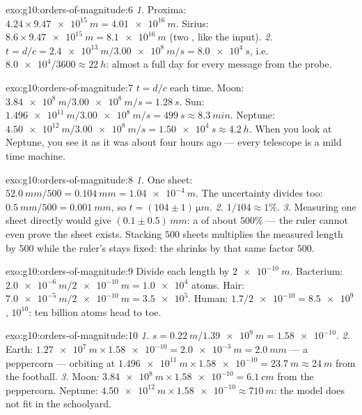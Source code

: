\begin{solution}{exo:g10:orders-of-magnitude:6}
\emph{1.} Proxima:
$4.24 \times \qty{9.47e15}{m} = \qty{4.01e16}{m}$. Sirius:
$8.6 \times \qty{9.47e15}{m} = \qty{8.1e16}{m}$ (two , like the input).
\emph{2.} $t = d/c = \qty{2.4e13}{m} / \qty{3.00e8}{m/s}
= \qty{8.0e4}{s}$, i.e.\ $\num{8.0e4}/3600 \approx \qty{22}{h}$:
almost a full day for every message from the probe.
\end{solution}

\begin{solution}{exo:g10:orders-of-magnitude:7}
$t = d/c$ each time. Moon:
$\qty{3.84e8}{m}/\qty{3.00e8}{m/s} = \qty{1.28}{s}$. Sun:
$\qty{1.496e11}{m}/\qty{3.00e8}{m/s} = \qty{499}{s} \approx
\qty{8.3}{min}$. Neptune:
$\qty{4.50e12}{m}/\qty{3.00e8}{m/s} = \qty{1.50e4}{s} \approx
\qty{4.2}{h}$. When you look at Neptune, you see it as it was about
four hours ago --- every telescope is a mild time machine.
\end{solution}

\begin{solution}{exo:g10:orders-of-magnitude:8}
\emph{1.} One sheet: $\qty{52.0}{mm}/500 = \qty{0.104}{mm}
= \qty{1.04e-4}{m}$. The uncertainty divides too:
$\qty{0.5}{mm}/500 = \qty{0.001}{mm}$, so
$t = (104 \pm 1)\,\unit{\micro m}$.
\emph{2.} $1/104 \approx 1\%$.
\emph{3.} Measuring one sheet directly would give
$(0.1 \pm 0.5)\,\unit{mm}$: a  of about $500\%$
--- the ruler cannot even prove the sheet exists. Stacking $500$
sheets multiplies the measured length by $500$ while the ruler's
 stays fixed: the  shrinks by
that same factor $500$.
\end{solution}

\begin{solution}{exo:g10:orders-of-magnitude:9}
Divide each length by $\qty{2e-10}{m}$. Bacterium:
$\qty{2.0e-6}{m}/\qty{2e-10}{m} = \num{1.0e4}$ atoms. Hair:
$\qty{7.0e-5}{m}/\qty{2e-10}{m} = \num{3.5e5}$. Human:
$1.7/\num{2e-10} = \num{8.5e9}$,  $10^{10}$: ten
billion atoms head to toe.
\end{solution}

\begin{solution}{exo:g10:orders-of-magnitude:10}
\emph{1.} $s = \qty{0.22}{m}/\qty{1.39e9}{m} = \num{1.58e-10}$.
\emph{2.} Earth:
$\qty{1.27e7}{m} \times \num{1.58e-10} = \qty{2.0e-3}{m} =
\qty{2.0}{mm}$ --- a peppercorn --- orbiting at
$\qty{1.496e11}{m} \times \num{1.58e-10} = \qty{23.7}{m} \approx
\qty{24}{m}$ from the football.
\emph{3.} Moon:
$\qty{3.84e8}{m} \times \num{1.58e-10} = \qty{6.1}{cm}$ from the
peppercorn. Neptune:
$\qty{4.50e12}{m} \times \num{1.58e-10} \approx \qty{710}{m}$: the
model does not fit in the schoolyard.
\end{solution}

